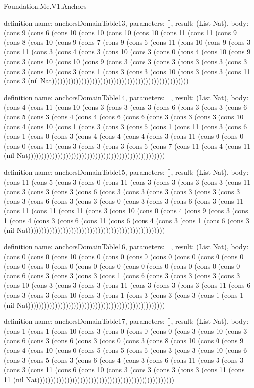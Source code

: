 \begin{lexlean}{Foundation.Me.V1.Anchors}
\begin{semanticmodule}
definition{
  name: anchorsDomainTable13,
  parameters: [],
  result: (List Nat),
  body: (cons 9 (cons 6 (cons 10 (cons 10 (cons 10 (cons 10 (cons 11 (cons 11 (cons 9 (cons 8 (cons 10 (cons 9 (cons 7 (cons 9 (cons 6 (cons 11 (cons 10 (cons 9 (cons 3 (cons 11 (cons 3 (cons 4 (cons 3 (cons 10 (cons 3 (cons 0 (cons 4 (cons 10 (cons 9 (cons 3 (cons 10 (cons 10 (cons 9 (cons 3 (cons 3 (cons 3 (cons 3 (cons 3 (cons 3 (cons 3 (cons 10 (cons 3 (cons 1 (cons 3 (cons 3 (cons 10 (cons 3 (cons 3 (cons 11 (cons 3 (nil Nat)))))))))))))))))))))))))))))))))))))))))))))))))))
}

definition{
  name: anchorsDomainTable14,
  parameters: [],
  result: (List Nat),
  body: (cons 4 (cons 11 (cons 10 (cons 3 (cons 3 (cons 3 (cons 6 (cons 3 (cons 3 (cons 6 (cons 5 (cons 3 (cons 4 (cons 4 (cons 6 (cons 6 (cons 3 (cons 3 (cons 3 (cons 10 (cons 4 (cons 10 (cons 1 (cons 3 (cons 3 (cons 6 (cons 1 (cons 11 (cons 3 (cons 6 (cons 1 (cons 0 (cons 3 (cons 4 (cons 4 (cons 4 (cons 3 (cons 11 (cons 0 (cons 0 (cons 0 (cons 11 (cons 3 (cons 3 (cons 3 (cons 6 (cons 7 (cons 11 (cons 4 (cons 11 (nil Nat)))))))))))))))))))))))))))))))))))))))))))))))))))
}

definition{
  name: anchorsDomainTable15,
  parameters: [],
  result: (List Nat),
  body: (cons 11 (cons 5 (cons 3 (cons 0 (cons 11 (cons 3 (cons 3 (cons 3 (cons 3 (cons 11 (cons 3 (cons 3 (cons 3 (cons 6 (cons 3 (cons 3 (cons 3 (cons 3 (cons 3 (cons 3 (cons 3 (cons 6 (cons 3 (cons 3 (cons 0 (cons 3 (cons 3 (cons 6 (cons 3 (cons 11 (cons 11 (cons 11 (cons 11 (cons 3 (cons 10 (cons 0 (cons 4 (cons 9 (cons 3 (cons 1 (cons 4 (cons 3 (cons 6 (cons 11 (cons 6 (cons 4 (cons 3 (cons 1 (cons 6 (cons 3 (nil Nat)))))))))))))))))))))))))))))))))))))))))))))))))))
}

definition{
  name: anchorsDomainTable16,
  parameters: [],
  result: (List Nat),
  body: (cons 0 (cons 0 (cons 10 (cons 0 (cons 0 (cons 0 (cons 0 (cons 0 (cons 0 (cons 0 (cons 0 (cons 0 (cons 0 (cons 0 (cons 0 (cons 0 (cons 0 (cons 0 (cons 0 (cons 0 (cons 6 (cons 3 (cons 3 (cons 3 (cons 1 (cons 6 (cons 3 (cons 3 (cons 3 (cons 3 (cons 10 (cons 3 (cons 3 (cons 3 (cons 11 (cons 3 (cons 3 (cons 3 (cons 11 (cons 6 (cons 3 (cons 3 (cons 10 (cons 3 (cons 1 (cons 3 (cons 3 (cons 3 (cons 1 (cons 1 (nil Nat)))))))))))))))))))))))))))))))))))))))))))))))))))
}

definition{
  name: anchorsDomainTable17,
  parameters: [],
  result: (List Nat),
  body: (cons 1 (cons 1 (cons 10 (cons 3 (cons 0 (cons 0 (cons 0 (cons 3 (cons 10 (cons 3 (cons 6 (cons 3 (cons 6 (cons 3 (cons 0 (cons 3 (cons 8 (cons 10 (cons 0 (cons 9 (cons 4 (cons 10 (cons 0 (cons 5 (cons 5 (cons 6 (cons 3 (cons 3 (cons 10 (cons 6 (cons 3 (cons 5 (cons 3 (cons 6 (cons 4 (cons 3 (cons 6 (cons 11 (cons 3 (cons 3 (cons 3 (cons 11 (cons 6 (cons 10 (cons 3 (cons 3 (cons 3 (cons 3 (cons 11 (cons 11 (nil Nat)))))))))))))))))))))))))))))))))))))))))))))))))))
}


\end{semanticmodule}
\end{lexlean}
